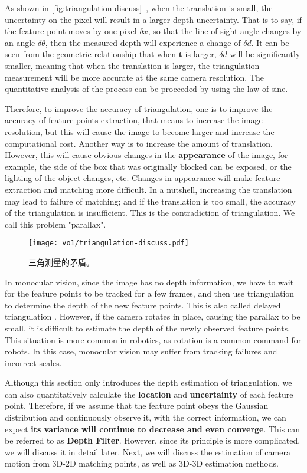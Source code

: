 As shown in \autoref{fig:triangulation-discuss}~, when the translation is small, the uncertainty on the pixel will result in a larger depth uncertainty. That is to say, if the feature point moves by one pixel $\delta x$, so that the line of sight angle changes by an angle $\delta \theta$, then the measured depth will experience a change of $\delta d$. It can be seen from the geometric relationship that when $\mathbf{t}$ is larger, $\delta d$ will be significantly smaller, meaning that when the translation is larger, the triangulation measurement will be more accurate at the same camera resolution. The quantitative analysis of the process can be proceeded by using the law of sine.

Therefore, to improve the accuracy of triangulation, one is to improve the accuracy of feature points extraction, that means to increase the image resolution, but this will cause the image to become larger and increase the computational cost. Another way is to increase the amount of translation. However, this will cause obvious changes in the \textbf{appearance} of the image, for example, the side of the box that was originally blocked can be exposed, or the lighting of the object changes, etc. Changes in appearance will make feature extraction and matching more difficult. In a nutshell, increasing the translation may lead to failure of matching; and if the translation is too small, the accuracy of the triangulation is insufficient. This is the contradiction of triangulation. We call this problem "parallax".

\begin{figure}[!ht]
	\centering
	\texttt{[image: vo1/triangulation-discuss.pdf]}
	\caption{三角测量的矛盾。}
	\label{fig:triangulation-discuss}
\end{figure}

In monocular vision, since the image has no depth information, we have to wait for the feature points to be tracked for a few frames, and then use triangulation to determine the depth of the new feature points. This is also called delayed triangulation \textsuperscript{\cite{Davison2003}}. However, if the camera rotates in place, causing the parallax to be small, it is difficult to estimate the depth of the newly observed feature points. This situation is more common in robotics, as rotation is a common command for robots. In this case, monocular vision may suffer from tracking failures and incorrect scales.

Although this section only introduces the depth estimation of triangulation, we can also quantitatively calculate the \textbf{location} and \textbf{uncertainty} of each feature point. Therefore, if we assume that the feature point obeys the Gaussian distribution and continuously observe it, with the correct information, we can expect \textbf{its variance will continue to decrease and even converge}. This can be referred to as \textbf{Depth Filter}. However, since its principle is more complicated, we will discuss it in detail later. Next, we will discuss the estimation of camera motion from 3D-2D matching points, as well as 3D-3D estimation methods.

